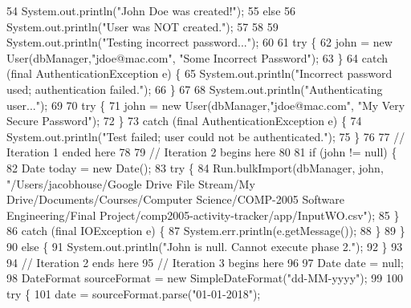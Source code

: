 \begin{DoxyCode}
54             System.out.println(\textcolor{stringliteral}{"John Doe was created!"});
55         \textcolor{keywordflow}{else}
56             System.out.println(\textcolor{stringliteral}{"User was NOT created."});
57 
58 
59         System.out.println(\textcolor{stringliteral}{"Testing incorrect password..."});
60 
61         \textcolor{keywordflow}{try} \{
62             john = \textcolor{keyword}{new} User(dbManager,\textcolor{stringliteral}{"jdoe@mac.com"}, \textcolor{stringliteral}{"Some Incorrect Password"});
63         \}
64         \textcolor{keywordflow}{catch} (\textcolor{keyword}{final} AuthenticationException e) \{
65             System.out.println(\textcolor{stringliteral}{"Incorrect password used; authentication failed."});
66         \}
67 
68         System.out.println(\textcolor{stringliteral}{"Authenticating user..."});
69 
70         \textcolor{keywordflow}{try} \{
71             john = \textcolor{keyword}{new} User(dbManager,\textcolor{stringliteral}{"jdoe@mac.com"}, \textcolor{stringliteral}{"My Very Secure Password"});
72         \}
73         \textcolor{keywordflow}{catch} (\textcolor{keyword}{final} AuthenticationException e) \{
74             System.out.println(\textcolor{stringliteral}{"Test failed; user could not be authenticated."});
75         \}
76 
77         \textcolor{comment}{// Iteration 1 ended here}
78 
79         \textcolor{comment}{// Iteration 2 begins here}
80 
81         \textcolor{keywordflow}{if} (john !=  null) \{
82             Date today = \textcolor{keyword}{new} Date();
83             \textcolor{keywordflow}{try} \{
84                 Run.bulkImport(dbManager, john, \textcolor{stringliteral}{"/Users/jacobhouse/Google Drive File Stream/My
       Drive/Documents/Courses/Computer Science/COMP-2005 Software Engineering/Final
       Project/comp2005-activity-tracker/app/InputWO.csv"});
85             \}
86             \textcolor{keywordflow}{catch} (\textcolor{keyword}{final} IOException e) \{
87                 System.err.println(e.getMessage());
88             \}
89         \}
90         \textcolor{keywordflow}{else} \{
91             System.out.println(\textcolor{stringliteral}{"John is null. Cannot execute phase 2."});
92         \}
93 
94         \textcolor{comment}{// Iteration 2 ends here}
95         \textcolor{comment}{// Iteration 3 begins here}
96 
97         Date date = null;
98         DateFormat sourceFormat = \textcolor{keyword}{new} SimpleDateFormat(\textcolor{stringliteral}{"dd-MM-yyyy"});
99 
100         \textcolor{keywordflow}{try} \{
101             date = sourceFormat.parse(\textcolor{stringliteral}{"01-01-2018"});

\end{DoxyCode}
